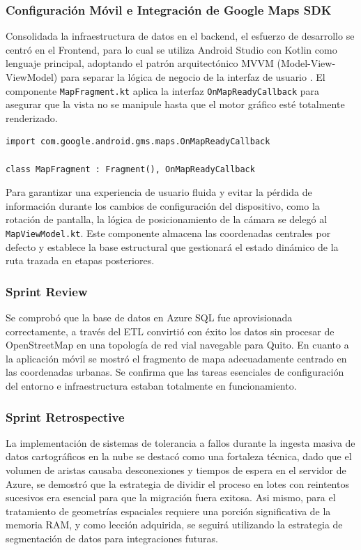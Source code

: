 \subsubsection{Configuración Móvil e Integración de Google Maps SDK}
Consolidada la infraestructura de datos en el backend, el esfuerzo de desarrollo se centró en el Frontend, para lo cual se utiliza Android Studio con Kotlin como lenguaje principal, adoptando el patrón arquitectónico MVVM (Model-View-ViewModel) para separar la lógica de negocio de la interfaz de usuario \cite{arif2020implementation}. El componente \texttt{MapFragment.kt} aplica la interfaz \texttt{OnMapReadyCallback} para asegurar que la vista no se manipule hasta que el motor gráfico esté totalmente renderizado. 

\begin{lstlisting}
import com.google.android.gms.maps.OnMapReadyCallback

class MapFragment : Fragment(), OnMapReadyCallback 
\end{lstlisting}

Para garantizar una experiencia de usuario fluida y evitar la pérdida de información durante los cambios de configuración del dispositivo, como la rotación de pantalla, la lógica de posicionamiento de la cámara se delegó al \texttt{MapViewModel.kt}. Este componente almacena las coordenadas centrales por defecto y establece la base estructural que gestionará el estado dinámico de la ruta trazada en etapas posteriores.


\subsubsection{Sprint Review}

Se comprobó que la base de datos en Azure SQL fue aprovisionada correctamente, a través del ETL convirtió con éxito los datos sin procesar de OpenStreetMap en una topología de red vial navegable para Quito. En cuanto a la aplicación móvil se mostró el fragmento de mapa adecuadamente centrado en las coordenadas urbanas. Se confirma que las tareas esenciales de configuración del entorno e infraestructura estaban totalmente en funcionamiento.

\subsubsection{Sprint Retrospective}

La implementación de sistemas de tolerancia a fallos durante la ingesta masiva de datos cartográficos en la nube se destacó como una fortaleza técnica, dado que el volumen de aristas causaba desconexiones y tiempos de espera en el servidor de Azure, se demostró que la estrategia de dividir el proceso en lotes con reintentos sucesivos era esencial para que la migración fuera exitosa. Asi mismo, para el tratamiento de geometrías espaciales requiere una porción significativa de la memoria RAM, y como lección adquirida, se seguirá utilizando la estrategia de segmentación de datos para integraciones futuras. 

